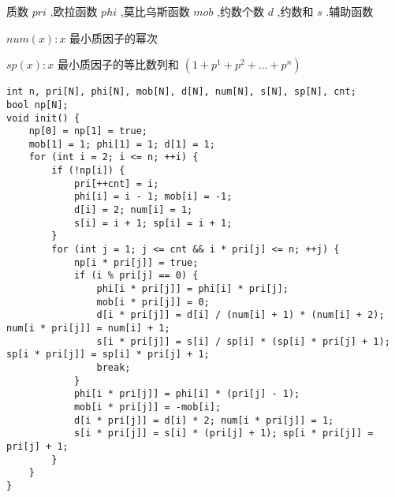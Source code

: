 \par \noindent 质数 $pri$ ,欧拉函数 $phi$ ,莫比乌斯函数 $mob$ ,约数个数 $d$ ,约数和 $s$ .辅助函数
~\\
\par \noindent $num(x):x$ 最小质因子的幂次
~\\
\par \noindent $sp(x):x$ 最小质因子的等比数列和 $\left(1+p^1+p^2+\ldots+p^n\right)$
\begin{verbatim}
int n, pri[N], phi[N], mob[N], d[N], num[N], s[N], sp[N], cnt;
bool np[N];
void init() {
    np[0] = np[1] = true;
    mob[1] = 1; phi[1] = 1; d[1] = 1;
    for (int i = 2; i <= n; ++i) {
        if (!np[i]) {
            pri[++cnt] = i;
            phi[i] = i - 1; mob[i] = -1;
            d[i] = 2; num[i] = 1;
            s[i] = i + 1; sp[i] = i + 1;
        }
        for (int j = 1; j <= cnt && i * pri[j] <= n; ++j) {
            np[i * pri[j]] = true;
            if (i % pri[j] == 0) {
                phi[i * pri[j]] = phi[i] * pri[j];
                mob[i * pri[j]] = 0;
                d[i * pri[j]] = d[i] / (num[i] + 1) * (num[i] + 2); num[i * pri[j]] = num[i] + 1;
                s[i * pri[j]] = s[i] / sp[i] * (sp[i] * pri[j] + 1); sp[i * pri[j]] = sp[i] * pri[j] + 1;
                break;
            }
            phi[i * pri[j]] = phi[i] * (pri[j] - 1);
            mob[i * pri[j]] = -mob[i];
            d[i * pri[j]] = d[i] * 2; num[i * pri[j]] = 1;
            s[i * pri[j]] = s[i] * (pri[j] + 1); sp[i * pri[j]] = pri[j] + 1;
        }
    }
}
\end{verbatim}
